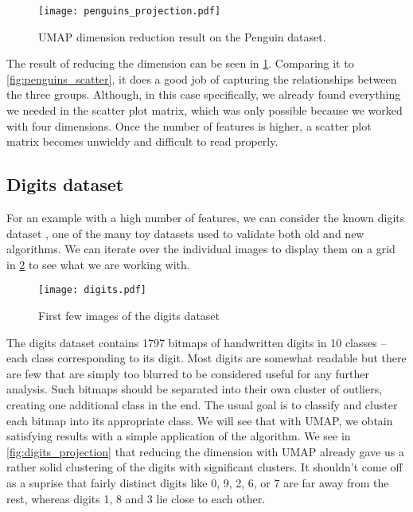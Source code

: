 \begin{figure}[h!]
  \centering
  \texttt{[image: penguins\_projection.pdf]}
  \caption{UMAP dimension reduction result on the Penguin dataset.}
  \label{fig:penguins_projection}
\end{figure}

The result of reducing the dimension can be seen in \ref{fig:penguins_projection}. Comparing it to \ref{fig:penguins_scatter}, it does a good job of capturing the relationships between the three groups. Although, in this case specifically, we already found everything we needed in the scatter plot matrix, which was only possible because we worked with four dimensions. Once the number of features is higher, a scatter plot matrix becomes unwieldy and difficult to read properly.

\subsection{Digits dataset}
For an example with a high number of features, we can consider the known digits dataset \cite{optical_recognition_of_handwritten_digits_80}, one of the many toy datasets used to validate both old and new algorithms. We can iterate over the individual images to display them on a grid in \ref{fig:digits} to see what we are working with.

\begin{figure}[h!]
  \centering
  \texttt{[image: digits.pdf]}
  \caption{First few images of the digits dataset}
  \label{fig:digits}
\end{figure}

The digits dataset contains 1797 bitmaps of handwritten digits in 10 classes -- each class corresponding to its digit. Most digits are somewhat readable but there are few that are simply too blurred to be considered useful for any further analysis. Such bitmaps should be separated into their own cluster of outliers, creating one additional class in the end.
The usual goal is to classify and cluster each bitmap into its appropriate class. We will see that with UMAP, we obtain satisfying results with a simple application of the algorithm. We see in \ref{fig:digits_projection} that reducing the dimension with UMAP already gave us a rather solid clustering of the digits with significant clusters. It shouldn't come off as a suprise that fairly distinct digits like 0, 9, 2, 6, or 7 are far away from the rest, whereas digits 1, 8 and 3 lie close to each other.


